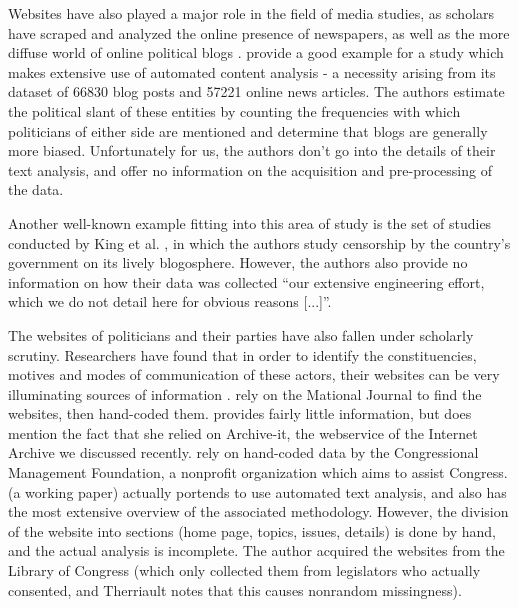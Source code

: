 \documentclass[11pt]{article}
\begin{document}
Websites have also played a major role in the field of media studies, as scholars have scraped and analyzed the online presence of newspapers, as well as the more diffuse world of online political blogs \citep{Adamic2005,Gentzkow2010}. \cite{Lin2011} provide a good example for a study which makes extensive use of automated content analysis - a necessity arising from its dataset of 66830 blog posts and 57221 online news articles. The authors estimate the political slant of these entities by counting the frequencies with which politicians of either side are mentioned and determine that blogs are generally more biased. Unfortunately for us, the authors don't go into the details of their text analysis, and offer no information on the acquisition and pre-processing of the data.

Another well-known example fitting into this area of study is the set of studies conducted by King et al. \citep{KING2013,King2014,KING2017}, in which the authors study censorship by the country's government on its lively blogosphere. However, the authors also provide no information on how their data was collected ``our extensive engineering effort, which we do not detail here for obvious reasons [...]''.

The websites of politicians and their parties have also fallen under scholarly scrutiny. Researchers have found that in order to identify the constituencies, motives and modes of communication of these actors, their websites can be very illuminating sources of information \citep{Druckman2009,Druckman2010,Cryer2017,Esterling2011,Esterling2011a,Norris2003,Therriault2010}. \cite{Druckman2009,Druckman2010} rely on the Mational Journal to find the websites, then hand-coded them. \cite{Cryer2017} provides fairly little information, but does mention the fact that she relied on Archive-it, the webservice of the Internet Archive we discussed recently. \cite{Esterling2011,Esterling2011a} rely on hand-coded data by the Congressional Management Foundation, a nonprofit organization which aims to assist Congress. \cite{Therriault2010} (a working paper) actually portends to use automated text analysis, and also has the most extensive overview of the associated methodology. However, the division of the website into sections (home page, topics, issues, details) is done by hand, and the actual analysis is incomplete. The author acquired the websites from the Library of Congress (which only collected them from legislators who actually consented, and Therriault notes that this causes nonrandom missingness).
\end{document}
